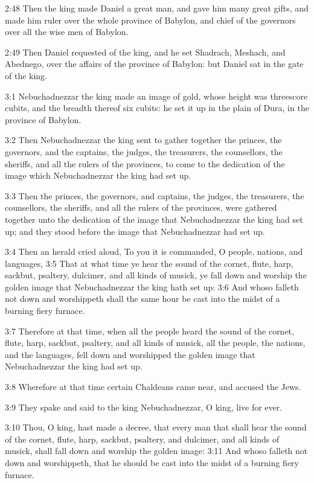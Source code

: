 2:48 Then the king made Daniel a great man, and gave him many great
gifts, and made him ruler over the whole province of Babylon, and
chief of the governors over all the wise men of Babylon.

2:49 Then Daniel requested of the king, and he set Shadrach, Meshach,
and Abednego, over the affairs of the province of Babylon: but Daniel
sat in the gate of the king.

3:1 Nebuchadnezzar the king made an image of gold, whose height was
threescore cubits, and the breadth thereof six cubits: he set it up in
the plain of Dura, in the province of Babylon.

3:2 Then Nebuchadnezzar the king sent to gather together the princes,
the governors, and the captains, the judges, the treasurers, the
counsellors, the sheriffs, and all the rulers of the provinces, to
come to the dedication of the image which Nebuchadnezzar the king had
set up.

3:3 Then the princes, the governors, and captains, the judges, the
treasurers, the counsellors, the sheriffs, and all the rulers of the
provinces, were gathered together unto the dedication of the image
that Nebuchadnezzar the king had set up; and they stood before the
image that Nebuchadnezzar had set up.

3:4 Then an herald cried aloud, To you it is commanded, O people,
nations, and languages, 3:5 That at what time ye hear the sound of the
cornet, flute, harp, sackbut, psaltery, dulcimer, and all kinds of
musick, ye fall down and worship the golden image that Nebuchadnezzar
the king hath set up: 3:6 And whoso falleth not down and worshippeth
shall the same hour be cast into the midst of a burning fiery furnace.

3:7 Therefore at that time, when all the people heard the sound of the
cornet, flute, harp, sackbut, psaltery, and all kinds of musick, all
the people, the nations, and the languages, fell down and worshipped
the golden image that Nebuchadnezzar the king had set up.

3:8 Wherefore at that time certain Chaldeans came near, and accused
the Jews.

3:9 They spake and said to the king Nebuchadnezzar, O king, live for
ever.

3:10 Thou, O king, hast made a decree, that every man that shall hear
the sound of the cornet, flute, harp, sackbut, psaltery, and dulcimer,
and all kinds of musick, shall fall down and worship the golden image:
3:11 And whoso falleth not down and worshippeth, that he should be
cast into the midst of a burning fiery furnace.

